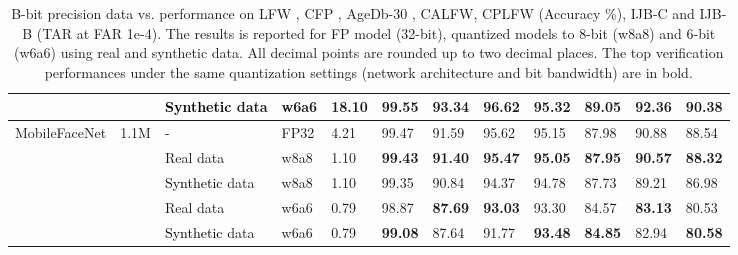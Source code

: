 \documentclass[a4paper,conference]{IEEEtran}
\begin{document}
\begin{table*}[!h]
\begin{tabular}{|l|l|l|l|l|lllll|ll|}
 &
   &
  \textcolor{black}{Synthetic} data &
  w6a6 &
  18.10 &
  \multicolumn{1}{l|}{\textbf{99.55}} &
  \multicolumn{1}{l|}{\textbf{93.34}} &
  \multicolumn{1}{l|}{\textbf{96.62}} &
  \multicolumn{1}{l|}{95.32} &
  \textbf{89.05} &
  \multicolumn{1}{l|}{92.36} &
  90.38 \\ \hline
\multirow{5}{*}{MobileFaceNet} &
  \multirow{5}{*}{1.1M} &
  - &
  FP32 &
  4.21 &
  \multicolumn{1}{l|}{99.47} &
  \multicolumn{1}{l|}{91.59} &
  \multicolumn{1}{l|}{95.62} &
  \multicolumn{1}{l|}{95.15} &
  87.98 &
  \multicolumn{1}{l|}{90.88} & 88.54
   \\ \cline{3-12} 
 &
   &
  Real data &
  w8a8 &
  1.10 &
  \multicolumn{1}{l|}{\textbf{99.43}} &
  \multicolumn{1}{l|}{\textbf{91.40}} &
  \multicolumn{1}{l|}{\textbf{95.47}} &
  \multicolumn{1}{l|}{\textbf{95.05}} &
  \textbf{87.95} &
  \multicolumn{1}{l|}{\textbf{90.57}} &
  \textbf{88.32} \\ \cline{3-12} 
 &
   &
  \textcolor{black}{Synthetic} data &
  w8a8 &
  1.10 &
  \multicolumn{1}{l|}{99.35} &
  \multicolumn{1}{l|}{90.84} &
  \multicolumn{1}{l|}{94.37} &
  \multicolumn{1}{l|}{94.78} &
  87.73 &
  \multicolumn{1}{l|}{89.21} &
  86.98 \\ \cline{3-12} 
 &
   &
  Real data &
  w6a6 &
  0.79 &
  \multicolumn{1}{l|}{98.87} &
  \multicolumn{1}{l|}{\textbf{87.69}} &
  \multicolumn{1}{l|}{\textbf{93.03}} &
  \multicolumn{1}{l|}{93.30} &
  84.57 &
  \multicolumn{1}{l|}{\textbf{83.13}} &
  80.53 \\ \cline{3-12} 
 & 
   &
  \textcolor{black}{Synthetic} data &
  w6a6 &
  0.79 &
  \multicolumn{1}{l|}{\textbf{99.08}} &
  \multicolumn{1}{l|}{87.64} &
  \multicolumn{1}{l|}{91.77} &
  \multicolumn{1}{l|}{\textbf{93.48}} &
  \textbf{84.85} &
  \multicolumn{1}{l|}{82.94} &
  \textbf{80.58} \\ \hline
\end{tabular}\vspace{-1mm}
\caption{B-bit precision data vs. performance on LFW , CFP , AgeDb-30 , CALFW, CPLFW (Accuracy \%), IJB-C and IJB-B (TAR at FAR 1e-4). The results is reported for FP model (32-bit), quantized models to 8-bit (w8a8) and 6-bit (w6a6) using real and synthetic data. All decimal points are rounded up to two decimal places. The top verification performances under the same quantization settings (network architecture and bit bandwidth) are in bold.}
\label{tab:result}
\vspace{-5mm}
\end{table*}
\end{document}
